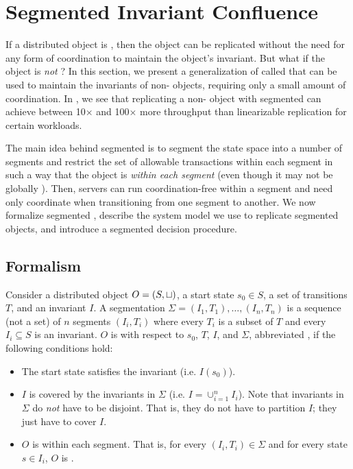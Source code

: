 \section{Segmented Invariant Confluence}
\newcommand{\IsIclosed}{\textsc{IsIclosed}}

If a distributed object is \invariantconfluent{}, then the object can be
replicated without the need for any form of coordination to maintain the
object's invariant. But what if the object is \emph{not} \invariantconfluent{}?
In this section, we present a generalization of \invariantconfluence{} called
 that can be used to maintain the
invariants of non-\invariantconfluent{} objects, requiring only a small amount
of coordination. In , we see that replicating a
non-\invariantconfluent{} object with segmented \invariantconfluence{} can
achieve between 10$\times$ and 100$\times$ more throughput than linearizable
replication for certain workloads.

The main idea behind segmented \invariantconfluence{} is to segment the state
space into a number of segments and restrict the set of allowable transactions
within each segment in such a way that the object is \invariantconfluent{}
\emph{within each segment} (even though it may not be globally
\invariantconfluent{}). Then, servers can run coordination-free within a
segment and need only coordinate when transitioning from one segment to
another. We now formalize segmented \invariantconfluence{}, describe the system
model we use to replicate segmented \invariantconfluent{} objects, and
introduce a segmented \invariantconfluence{} decision procedure.

\subsection{Formalism}
Consider a distributed object $O = (S, \sqcup)$, a start state $s_0 \in S$, a
set of transitions $T$, and an invariant $I$. A segmentation $\Sigma = (I_1,
T_1), \ldots, (I_n, T_n)$ is a sequence (not a set) of $n$ segments $(I_i,
T_i)$ where every $T_i$ is a subset of $T$ and every $I_i \subseteq S$ is an
invariant. $O$ is  with respect to
$s_0$, $T$, $I$, and $\Sigma$, abbreviated , if the
following conditions hold:
\begin{itemize}
  \item
    The start state satisfies the invariant (i.e. $I(s_0)$).

  \item
    $I$ is covered by the invariants in $\Sigma$ (i.e. $I = \cup_{i=1}^n I_i$).
    Note that invariants in $\Sigma$ do \emph{not} have to be disjoint. That
    is, they do not have to partition $I$; they just have to cover $I$.

  \item
    $O$ is \invariantconfluent{} within each segment. That is, for every $(I_i,
    T_i) \in \Sigma$ and for every state $s \in I_i$, $O$ is
    .
\end{itemize}


